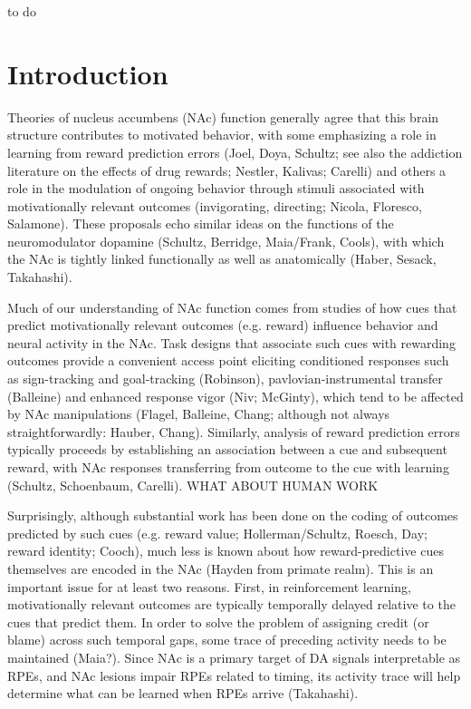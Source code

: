 \documentclass[11pt]{article}
\let\cite=\citep
\providecommand{\DIFadd}[1]{{\protect\color{blue}\uwave{#1}}} %
\providecommand{\DIFaddbegin}{} %
\providecommand{\DIFaddend}{} %
\newcommand{\DIFaddincludegraphics}[2][]{{\color{blue}\fbox{\DIFOincludegraphics[#1]{#2}}}} %
\DeclareRobustCommand{\DIFaddbegin}{\DIFOaddbegin \let\includegraphics\DIFaddincludegraphics} %
\DeclareRobustCommand{\DIFaddend}{\DIFOaddend \let\includegraphics\DIFOincludegraphics} %
\begin{document}
to do

\newpage

\section*{Introduction}

Theories of nucleus accumbens (NAc) function generally agree that this brain structure contributes to motivated behavior, with some emphasizing a role in learning from reward prediction errors (Joel, Doya, Schultz; see also the addiction literature on the effects of drug rewards; Nestler, Kalivas; Carelli) and others a role in the modulation of ongoing behavior through stimuli associated with motivationally relevant outcomes (invigorating, directing; Nicola, Floresco, Salamone). These proposals echo similar ideas on the functions of the neuromodulator dopamine (Schultz, Berridge, Maia/Frank, Cools), with which the NAc is tightly linked functionally as well as anatomically (Haber, Sesack, Takahashi).

Much of our understanding of NAc function comes from studies of how cues that predict motivationally relevant outcomes (e.g. reward) influence behavior and neural activity in the NAc. Task designs that associate such cues with rewarding outcomes provide a convenient access point eliciting conditioned responses such as sign-tracking and goal-tracking (Robinson), pavlovian-instrumental transfer (Balleine) and enhanced response vigor (Niv; McGinty), which tend to be affected by NAc manipulations (Flagel, Balleine, Chang; although not always straightforwardly: Hauber, Chang). Similarly, analysis of reward prediction errors typically proceeds by establishing an association between a cue and subsequent reward, with NAc responses transferring from outcome to the cue with learning (Schultz, Schoenbaum, Carelli). WHAT ABOUT HUMAN WORK

Surprisingly, although substantial work has been done on the coding of outcomes predicted by such cues (e.g. reward value; Hollerman/Schultz, Roesch, Day; reward identity; Cooch), much less is known about how reward-predictive cues themselves are encoded in the NAc (Hayden from primate realm). This is an important issue for at least two reasons. First, in reinforcement learning, motivationally relevant outcomes are typically temporally delayed relative to the cues that predict them. In order to solve the problem of assigning credit (or blame) across such temporal gaps, some trace of preceding activity needs to be maintained \DIFaddbegin \DIFadd{\mbox{%
\cite{Lee2012} }\hspace{0pt}%
}\DIFaddend (Maia?). Since NAc is a primary target of DA signals interpretable as RPEs, and NAc lesions impair RPEs related to timing, its activity trace will help determine what can be learned when RPEs arrive (Takahashi).
\end{document}
